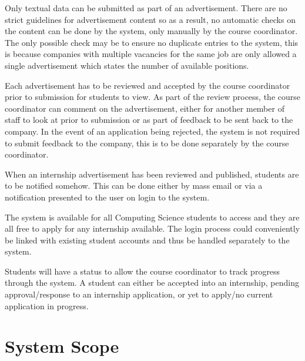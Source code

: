 \documentclass{l3deliverable}
\begin{document}
Only textual data can be submitted as part of an advertisement. There are no
strict guidelines for advertisement content so as a result, no automatic checks
on the content can be done by the system, only manually by the course
coordinator. The only possible check may be to ensure no duplicate entries
to the system, this is because companies with multiple vacancies for the same
job are only allowed a single advertisement which states the number of
available positions.

Each advertisement has to be reviewed and accepted by the course coordinator
prior to submission for students to view. As part of the review process, the
course coordinator can comment on the advertisement, either for another member
of staff to look at prior to submission or as part of feedback to be sent back
to the company. In the event of an application being rejected, the system is
not required to submit feedback to the company, this is to be done separately
by the course coordinator.

When an internship advertisement has been reviewed and published, students 
are to be notified somehow. This can be done either by mass email or via a 
notification presented to the user on login to the system.

The system is available for all Computing Science students to access and 
they are all free to apply for any internship available. The login process could
conveniently be linked with existing student accounts and thus be handled
separately to the system.

Students will have a status to allow the course coordinator to track progress
through the system. A student can either be accepted into an internship, pending
approval/response to an internship application, or yet to apply/no current 
application in progress.


\section{System Scope}


\end{document}
